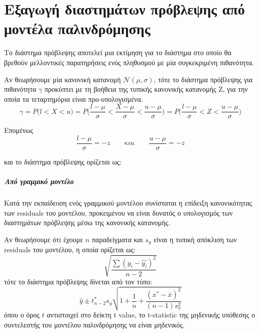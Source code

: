 \chapter{Εξαγωγή διαστημάτων πρόβλεψης από μοντέλα παλινδρόμησης}
\label{appendix:Intervals}

Το διάστημα πρόβλεψης αποτελεί μια εκτίμηση για το διάστημα στο οποίο θα βρεθούν μελλοντικές παρατηρήσεις ενός πληθυσμού με μία συγκεκριμένη πιθανότητα.

Αν θεωρήσουμε μία κανονική κατανομή  $\mathcal{N} (\mu, \sigma)$, τότε το διάστημα πρόβλεψης για πιθανότητα $\gamma$ προκύπτει με τη βοήθεια της τυπικής κανονικής κατανομής Z, για την οποία τα τεταρτημόρια είναι προ-υπολογισμένα.
\begin{equation}
\gamma = P\big(l < X < u\big) = P\Bigg(\frac{l-\mu}{\sigma} < \frac{X-\mu}{\sigma} < \frac{u-\mu}{\sigma}\Bigg)= P\Bigg(\frac{l-\mu}{\sigma} < Z < \frac{u-\mu}{\sigma}\Bigg)
\end{equation}

Επομένως
\begin{equation}
\frac{l-\mu}{\sigma} = -z \qquad\text{και}\qquad \frac{u-\mu}{\sigma} = -z
\end{equation}

και το διάστημα πρόβλεψης ορίζεται ως:
\begin{equation}
	[\mu - z \sigma, \mu + z \sigma ]
\end{equation}

\paragraph{Από γραμμικό μοντέλο}
Κατά την εκπαίδευση ενός γραμμικού μοντέλου συνίσταται η επίδειξη κανονικότητας των residuals του μοντέλου, προκειμένου να είναι δυνατός ο υπολογισμός των διαστημάτων πρόβλεψης μέσω της κανονικής κατανομής.

Αν θεωρήσουμε ότι έχουμε $n$ παραδείγματα και $s_y$ είναι η τυπική απόκλιση των residuals του μοντέλου, η οποία ορίζεται ως:
\begin{equation}
\sqrt{\frac{\sum(y_i - \hat{y_i})^2}{n-2}}
\end{equation}
τότε το διάστημα πρόβλεψης δίνεται από τον τύπο:
\begin{equation}
\hat{y}\pm t^*_{n-2} s_y \sqrt{1 + \frac{1}{n} + \frac{(x^* - \bar{x})^2}{(n-1) s_x^2}}
\end{equation}
όπου ο όρος $t$ αντιστοιχεί στο δείκτη t value, το t-statistic της μηδενικής υπόθεσης ο συντελεστής του μοντέλου παλινδρόμησης να είναι μηδενικός.   


